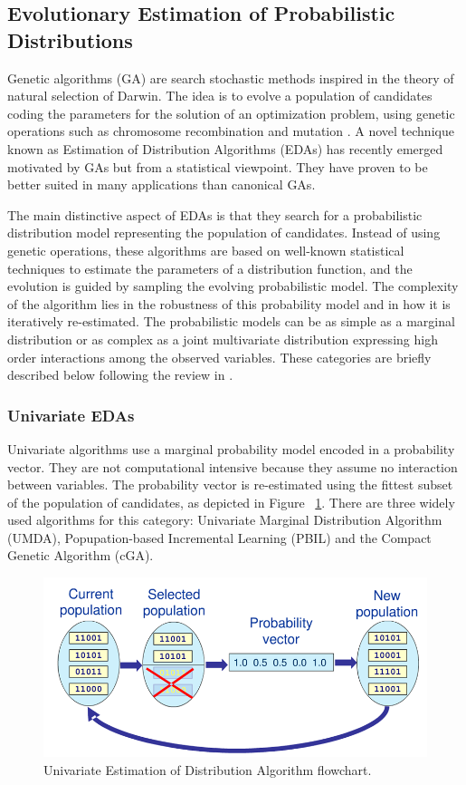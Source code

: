\subsection{Evolutionary Estimation  of Probabilistic Distributions}
Genetic algorithms (GA) are search stochastic methods inspired in the theory of natural selection of Darwin.  The idea is to evolve a population of candidates coding the parameters for the solution of an optimization problem, using genetic operations such as chromosome recombination and mutation \cite{goldberg89}. A novel technique known as Estimation of Distribution Algorithms (EDAs) has recently emerged motivated by GAs but from a statistical viewpoint. They have proven to be better suited in many applications than canonical GAs\cite{larranaga01}.  

The main distinctive aspect of EDAs is that they search for a probabilistic distribution model representing the population of candidates. Instead of using genetic operations, these algorithms are based on well-known statistical techniques to estimate the parameters of a distribution function, and the evolution is guided by sampling the evolving probabilistic model. The complexity of the algorithm lies in the robustness of this probability model and in how it is iteratively re-estimated.  The probabilistic models can be as simple as a marginal distribution or as complex as a joint multivariate distribution expressing high order interactions among the observed variables. These categories are briefly described below following the review in \cite{larranaga08}.

\subsubsection{Univariate EDAs}
Univariate algorithms use a marginal probability model encoded in a probability vector.  They are not computational intensive because they assume no interaction between variables. The probability vector is re-estimated using the fittest subset of the population of candidates, as depicted in Figure ~\ref{fig:im04}. There are three widely used algorithms for this category: Univariate Marginal Distribution Algorithm (UMDA\cite{muhlen96}), Popupation-based Incremental Learning (PBIL\cite{baluja94}) and the Compact Genetic Algorithm (cGA\cite{baluja95, harik98}).  

\begin{figure}[ht]
	\centering
		\includegraphics{Images/edas.png}
	\caption{Univariate Estimation of Distribution Algorithm flowchart.}
	\label{fig:im04}
\end{figure}

